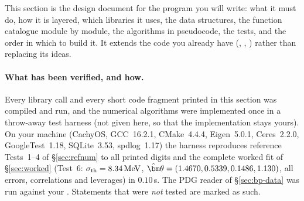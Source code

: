 \documentclass[11pt,a4paper]{article}
\numberwithin{equation}{section}
\theoremstyle{definition}
\theoremstyle{plain}
\theoremstyle{remark}
\numberwithin{algorithm}{section}
\newcommand{\MeV}{\,\mathrm{MeV}}
\newcommand{\vth}{\bm\theta}
\begin{document}
This section is the design document for the program you will write: what it must do, how it is layered, which libraries it uses, the data structures, the function catalogue module by module, the algorithms in pseudocode, the tests, and the order in which to build it. It extends the code you already have (, , ) rather than replacing its ideas.

\paragraph{What has been verified, and how.} Every library call and every short code fragment printed in this section was compiled and run, and the numerical algorithms were implemented once in a throw-away test harness (not given here, so that the implementation stays yours). On your machine (CachyOS, GCC~16.2.1, CMake~4.4.4, Eigen~5.0.1, Ceres~2.2.0, GoogleTest~1.18, SQLite~3.53, spdlog~1.17) the harness reproduces reference Tests~1--4 of \S\ref{sec:refnum} to all printed digits and the complete worked fit of \S\ref{sec:worked} (Test~6: $\sigma_{\rm th}=8.34\MeV$, $\hat\vth=(1.4670,0.5339,0.1486,1.130)$, all errors, correlations and leverages) in $0.10\,$s. The PDG reader of \S\ref{sec:bp-data} was run against your . Statements that were \emph{not} tested are marked as such.

\end{document}
